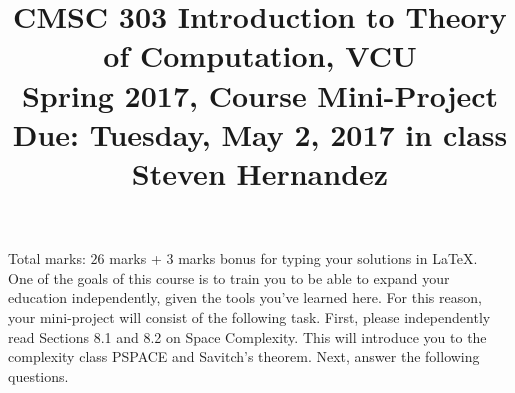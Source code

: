 \documentclass{article}
\begin{document}
\title{CMSC 303 Introduction to Theory of Computation, VCU\\Spring 2017, Course Mini-Project\\Due: Tuesday, May 2, 2017 in class \\ Steven Hernandez}
\date{}
\maketitle
\vspace{-5mm}
\noindent Total marks: $26$ marks + $3$ marks bonus for typing your solutions in LaTeX.\vspace{2mm}\\

One of the goals of this course is to train you to be able to expand your education independently, given the tools you've learned here. For this reason, your mini-project will consist of the following task. First, please independently read Sections 8.1 and 8.2 on Space Complexity. This will introduce you to the complexity class PSPACE and Savitch's theorem. Next, answer the following questions.
\end{document}
